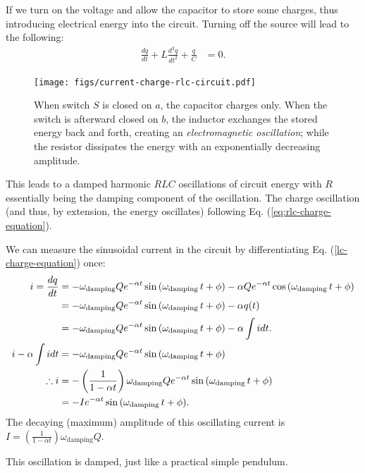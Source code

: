 \documentclass[12pt,b4paper]{article}
\begin{document}
If we turn on the voltage and allow the capacitor to store some charges, thus introducing electrical energy into the circuit. Turning off the source will lead to the following:
\begin{align}
    \frac{dq}{dt}+L\frac{d^2q}{dt^2}+\frac{q}{C}&=0.
\end{align}
\begin{figure}[H]
    \centering
    \texttt{[image: figs/current-charge-rlc-circuit.pdf]}
    \caption{When switch $S$ is closed on $a$, the capacitor charges only. When the switch is afterward closed on $b$, the inductor exchanges the stored energy back and forth, creating an \textit{electromagnetic oscillation}; while the resistor dissipates the energy with an exponentially decreasing amplitude.}
    \label{fig:current-charge-lc-circuit}
\end{figure}
This leads to a damped harmonic $RLC$ oscillations of circuit energy with $R$ essentially being the damping component of the oscillation. The charge oscillation (and thus, by extension, the energy oscillates) following Eq. (\ref{eq:rlc-charge-equation}).

We can measure the sinusoidal current in the circuit by differentiating Eq. (\ref{lc-charge-equation}) once:
\begin{align}
    i=\frac{dq}{dt}&=-\omega_\text{damping}Qe^{-\alpha t}\sin{(\omega_\text{damping}\,t+\phi)}-\alpha Qe^{-\alpha t}\cos{(\omega_\text{damping}\,t + \phi)}\notag\\
    &=-\omega_\text{damping}Qe^{-\alpha t}\sin{(\omega_\text{damping}\,t+\phi)}-\alpha q(t) \notag\\[1.75pt]
    &=-\omega_\text{damping}Qe^{-\alpha t}\sin{(\omega_\text{damping}\,t+\phi)}-\alpha\int idt.\notag\\
    i-\alpha\int idt&=-\omega_\text{damping}Qe^{-\alpha t}\sin{(\omega_\text{damping}\,t+\phi)}\notag\\
    \therefore i&=-\left(\frac{1}{1-\alpha t}\right)\omega_\text{damping}Qe^{-\alpha t}\sin{(\omega_\text{damping}\,t+\phi)}\\
    &=-Ie^{-\alpha t}\sin{(\omega_\text{damping}\,t+\phi)}.
\end{align}
The decaying (maximum) amplitude of this oscillating current is $\displaystyle I=\left(\frac{1}{1-\alpha t}\right)\omega_\text{damping}Q$.

This oscillation is damped, just like a practical simple pendulum.
\end{document}
